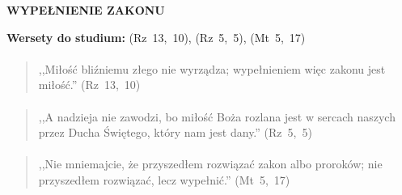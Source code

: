\documentclass[10pt,a4paper,oneside]{article}
\begin{document}
\centerline{\textbf{\MakeUppercase{Wypełnienie zakonu}}}
\begin{center}
\textbf{Wersety do studium:} 
\mbox{(Rz 13, 10)}, \mbox{(Rz 5, 5)}, \mbox{(Mt 5, 17)}
\end{center}
\paragraph{}
\begin{quote}
,,Miłość bliźniemu złego nie wyrządza; wypełnieniem więc zakonu jest miłość.'' \mbox{(Rz 13, 10)}
\end{quote}
\paragraph{}
\begin{quote}
,,A nadzieja nie zawodzi, bo miłość Boża rozlana jest w sercach naszych przez Ducha Świętego, który nam jest dany.'' \mbox{(Rz 5, 5)}
\end{quote}
\paragraph{}
\begin{quote}
,,Nie mniemajcie, że przyszedłem rozwiązać zakon albo proroków; nie przyszedłem rozwiązać, lecz wypełnić.'' \mbox{(Mt 5, 17)}
\end{quote}
\end{document}
